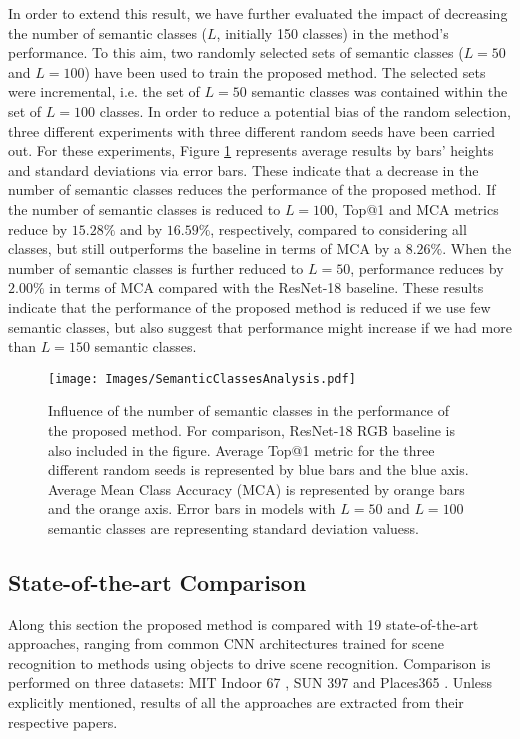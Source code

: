 \documentclass[review, 3p, sort&compress]{elsarticle}
\begin{document}
In order to extend this result, we have further evaluated the impact of decreasing the number of semantic classes (\(L\), initially 150 classes) in the method's performance. To this aim, two randomly selected sets of semantic classes (\(L=50\) and \(L=100\)) have been used to train the proposed method. The selected sets were incremental, i.e. the set of \(L=50\) semantic classes was contained within the set of \(L=100\) classes. In order to reduce a potential bias of the random selection, three different experiments with three different random seeds have been carried out. For these experiments, Figure \ref{fig::Ablation different number of semantic classes} represents average results by bars' heights and standard deviations via error bars. These indicate that a decrease in the number of semantic classes reduces the performance of the proposed method. If the number of semantic classes is reduced to \(L=100\), Top@1 and MCA metrics reduce by \(15.28 \%\) and by \(16.59 \%\), respectively, compared to considering all classes, but still outperforms the baseline in terms of MCA by a \(8.26 \%\). When the number of semantic classes is further reduced to \(L=50\), performance reduces by \(2.00 \%\) in terms of MCA compared with the ResNet-18 baseline. These results indicate that the performance of the proposed method is reduced if we use few semantic classes, but also suggest that performance might increase if we had more than \(L=150\) semantic classes.

\begin{figure}[t!]
    \centering
    \texttt{[image: Images/SemanticClassesAnalysis.pdf]}
    \caption{Influence of the number of semantic classes in the performance of the proposed method. For comparison, ResNet-18 RGB baseline is also included in the figure. Average Top@1 metric for the three different random seeds is represented by blue bars and the blue axis. Average Mean Class Accuracy (MCA) is represented by orange bars and the orange axis. Error bars in models with \(L=50\) and \(L=100\) semantic classes are representing standard deviation valuess.}
    \label{fig::Ablation different number of semantic classes}
\end{figure}

\subsection{State-of-the-art Comparison}
Along this section the proposed method is compared with 19 state-of-the-art approaches, ranging from common CNN architectures trained for scene recognition to methods using objects to drive scene recognition. Comparison is performed on three datasets: MIT Indoor 67 \cite{quattoni2009recognizing}, SUN 397 \cite{xiao2010sun} and Places365 \cite{zhou2018places}. Unless explicitly mentioned, results of all the approaches are extracted from their respective papers.
\end{document}
